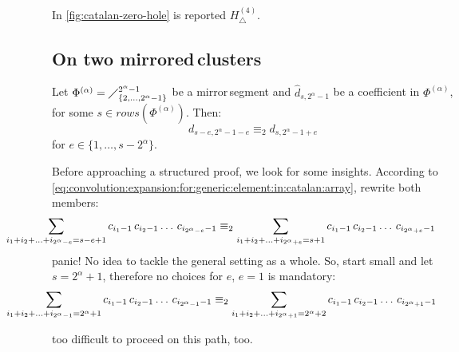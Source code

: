 
In \autoref{fig:catalan-zero-hole} is reported $H_{\bigtriangleup}^{(4)}$.

\subsection{On two \flqq mirrored\frqq\,clusters}

\begin{theorem}
    Let $\Phi^{(\alpha)}=\diagup_{\lbrace 2,\ldots,2^{\alpha}-1\rbrace}^{2^{\alpha}-1}$
    be a \flqq mirror\frqq\,segment and $\hat{d}_{s,2^{{\alpha}}-1}$ 
    be a coefficient in $\Phi^{(\alpha)}$, for some $s\in rows\left(\Phi^{(\alpha)}\right)$. Then:
    \begin{displaymath}
        d_{s-e,2^{{\alpha}}-1-e} \equiv_{2} d_{s,2^{{\alpha}}-1+e}
    \end{displaymath}
    for $e\in\lbrace1,\ldots,s-2^{{\alpha}}\rbrace$.
\end{theorem}

Before approaching a structured proof, we look for some insights.
According to \autoref{eq:convolution:expansion:for:generic:element:in:catalan:array},
rewrite both members:
\begin{displaymath}
    \hspace{-2cm}
    \sum_{i_{1}+i_{2}+\ldots+i_{2^{\alpha}-e}=s-e+1}
        {c_{i_{1}-1}\,c_{i_{2}-1}\ldots\,c_{i_{2^{\alpha}-e}-1}}
    \equiv_{2}
    \sum_{i_{1}+i_{2}+\ldots+i_{2^{\alpha}+e}=s+1}
        {c_{i_{1}-1}\,c_{i_{2}-1}\ldots\,c_{i_{2^{\alpha}+e}-1}}
\end{displaymath}
panic! No idea to tackle the general setting as a whole. So, start small and
let $s=2^{{\alpha}}+1$, therefore no choices for $e$, $e=1$ is mandatory:
\begin{displaymath}
    \hspace{-2cm}
    \sum_{i_{1}+i_{2}+\ldots+i_{2^{\alpha}-1}=2^{{\alpha}}+1}
        {c_{i_{1}-1}\,c_{i_{2}-1}\ldots\,c_{i_{2^{\alpha}-1}-1}}
    \equiv_{2}
    \sum_{i_{1}+i_{2}+\ldots+i_{2^{\alpha}+1}=2^{{\alpha}}+2}
        {c_{i_{1}-1}\,c_{i_{2}-1}\ldots\,c_{i_{2^{\alpha}+1}-1}}
\end{displaymath}

too difficult to proceed on this path, too. 

